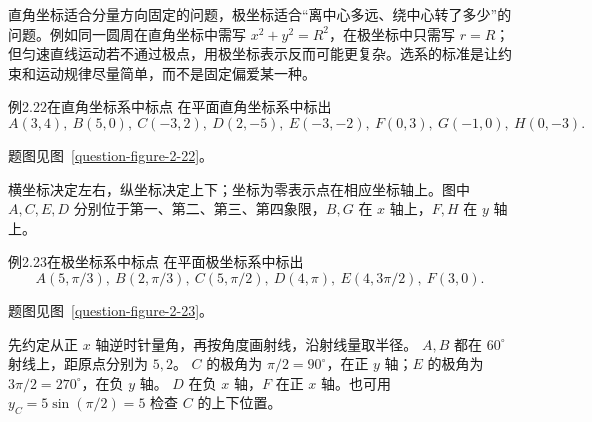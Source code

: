 直角坐标适合分量方向固定的问题，极坐标适合“离中心多远、绕中心转了多少”的问题。例如同一圆周在直角坐标中需写 $x^2+y^2=R^2$，在极坐标中只需写 $r=R$；但匀速直线运动若不通过极点，用极坐标表示反而可能更复杂。选系的标准是让约束和运动规律尽量简单，而不是固定偏爱某一种。

\begin{origexamplebox}{例2.22\quad 在直角坐标系中标点}
在平面直角坐标系中标出
\[
A(3,4),\ B(5,0),\ C(-3,2),\ D(2,-5),\ E(-3,-2),\ F(0,3),\ G(-1,0),\ H(0,-3).
\]
\par 题图见图~\ref{question-figure-2-22}。
\KQuestionAW
\end{origexamplebox}
\begin{xesolution}
横坐标决定左右，纵坐标决定上下；坐标为零表示点在相应坐标轴上。图中 $A,C,E,D$ 分别位于第一、第二、第三、第四象限，$B,G$ 在 $x$ 轴上，$F,H$ 在 $y$ 轴上。
\begin{center}\end{center}
\end{xesolution}

\ifdefined\Needspace{}\fi
\begin{origexamplebox}{例2.23\quad 在极坐标系中标点}
在平面极坐标系中标出
\[
A(5,\pi/3),\ B(2,\pi/3),\ C(5,\pi/2),\ D(4,\pi),\ E(4,3\pi/2),\ F(3,0).
\]
\par 题图见图~\ref{question-figure-2-23}。
\KQuestionAX
\end{origexamplebox}
\begin{xesolution}
先约定从正 $x$ 轴逆时针量角，再按角度画射线，沿射线量取半径。
$A,B$ 都在 $60^\circ$ 射线上，距原点分别为 $5,2$。
$C$ 的极角为 $\pi/2=90^\circ$，在正 $y$ 轴；$E$ 的极角为 $3\pi/2=270^\circ$，在负 $y$ 轴。
$D$ 在负 $x$ 轴，$F$ 在正 $x$ 轴。也可用 $y_C=5\sin(\pi/2)=5$ 检查 $C$ 的上下位置。
\begin{center}\end{center}
\end{xesolution}

